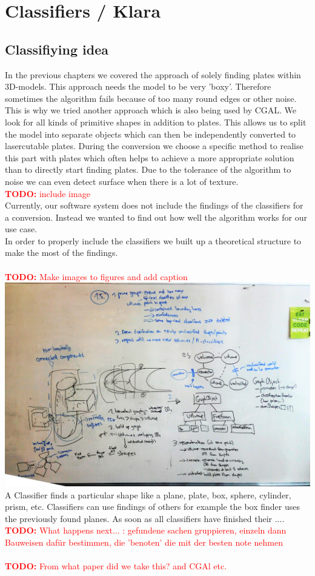 \documentclass[../ClassicThesis.tex]{subfiles}
\begin{document}
\chapter{Classifiers / Klara}\label{ch:classifiers}
\newcommand{\TODO}[1]{\textcolor{red}{\\ \textbf{TODO:} #1 \\}}

\section{Classifiying idea}
In the previous chapters we covered the approach of solely finding plates within 3D-models. This approach needs the model to be very 'boxy'. Therefore sometimes the algorithm fails because of too many round edges or other noise. \\
This is why we tried another approach which is also being used by CGAL. We look for all kinds of primitive shapes in addition to plates. This allows us to split the model into separate objects which can then be independently converted to lasercutable plates. During the conversion we choose a specific method to realise this part with plates which often helps to achieve a more appropriate solution than to directly start finding plates. Due to the tolerance of the algorithm to noise we can even detect surface when there is a lot of texture. \TODO{include image}
Currently, our software system does not include the findings of the classifiers for a conversion. Instead we wanted to find out how well the algorithm works for our use case. \\
In order to properly include the classifiers we built up a theoretical structure to make the most of the findings. \\
\TODO{Make images to figures and add caption}
\includegraphics[width=0.5\columnwidth]{Images/10-classifiers-ClassificationStructureGraphBuilding.jpg}\\
A Classifier finds a particular shape like a plane, plate, box, sphere, cylinder, prism, etc. Classifiers can use findings of others for example the box finder uses the previously found planes. As soon as all classifiers have finished their .... \TODO{What happens next... : gefundene sachen gruppieren, einzeln dann Bauweisen dafür bestimmen, die 'benoten' die mit der besten note nehmen} 
\TODO{From what paper did we take this? and CGAl etc.}
\end{document}
